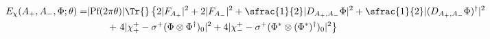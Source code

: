 \begin{equation}\label{eq:energy}
\begin{split}
 E_\chi(A_+,A_-,\Phi;\theta)=&|\text{Pf}(2\pi\theta)|
 \Tr{}\left\{2|F_{A_+}|^2+2|F_{A_-}|^2+
 \sfrac{1}{2}|D_{A_+,A_-}\Phi|^2+
 \sfrac{1}{2}|(D_{A_+,A_-}\Phi)^\dagger|^2\right.\\
 &\left.\qquad+\,\,4|\chi^+_+-\sigma^+(\Phi\otimes\Phi^\dagger)_0|^2+
 4|\chi^+_--\sigma^+(\Phi^*\otimes(\Phi^*)^\dagger)_0|^2 \right\}
\end{split}
\end{equation}

